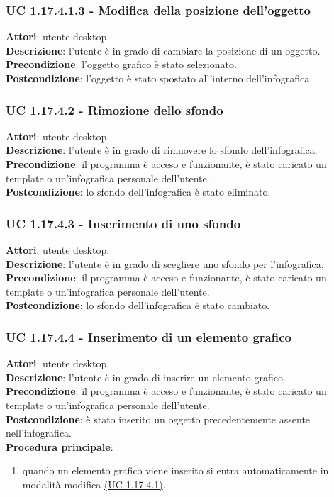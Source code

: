 {\subsubsection{UC 1.17.4.1.3 - Modifica della posizione dell'oggetto}{
	\label{uc1.17.4.1.3}
	\textbf{Attori}: utente desktop. \\
	\textbf{Descrizione}: l'utente è in grado di cambiare la posizione di un oggetto. \\
	\textbf{Precondizione}: l'oggetto grafico è stato selezionato.\\
	\textbf{Postcondizione}: l'oggetto è stato spostato all’interno dell’infografica.	\\
	}
\subsubsection{UC 1.17.4.2 - Rimozione dello sfondo}{
	\label{uc1.17.4.2}
	\textbf{Attori}: utente desktop. \\
	\textbf{Descrizione}: l'utente è in grado di rimuovere lo sfondo dell’infografica. \\
	\textbf{Precondizione}: il programma è acceso e funzionante, è stato caricato un template o un'infografica personale dell'utente.	\\
	\textbf{Postcondizione}: lo sfondo dell'infografica è stato eliminato.	\\
	}
\subsubsection{UC 1.17.4.3 - Inserimento di uno sfondo}{
	\label{uc1.17.4.3}
	\textbf{Attori}: utente desktop. \\
	\textbf{Descrizione}: l'utente è in grado di scegliere uno sfondo per l'infografica. \\
	\textbf{Precondizione}: il programma è acceso e funzionante, è stato caricato un template o un'infografica personale dell'utente.	\\
	\textbf{Postcondizione}: lo sfondo dell'infografica è stato cambiato.	\\
	}
\subsubsection{UC 1.17.4.4 - Inserimento di un elemento grafico}{
	\label{uc1.17.4.4}
	\textbf{Attori}: utente desktop. \\
	\textbf{Descrizione}: l'utente è in grado di inserire un elemento grafico. \\
	\textbf{Precondizione}: il programma è acceso e funzionante, è stato caricato un template o un'infografica personale dell'utente.	\\
	\textbf{Postcondizione}: è stato inserito un oggetto precedentemente assente nell'infografica.	\\
	\textbf{Procedura principale}:
	\begin{enumerate}
		\item quando un elemento grafico viene inserito si entra automaticamente in modalità modifica \hyperref[uc1.17.4.1]{(UC 1.17.4.1)}.
	\end{enumerate}
	}
}
